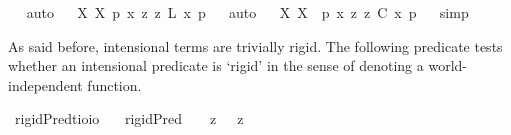 \begin{isabellebody}
\ %
%
\isamarkupfalse%
\ auto%
%
%
\ \isanewline
{}\isamarkupfalse%
\ {\isachardoublequoteopen}{\isasymlfloor}{\isacharparenleft}{\isacharparenleft}{\isasymlambda}X{\isachardot}\ \isactrlbold {\isasymbox}{\isacharparenleft}X\ {\isasymdownharpoonleft}{\isacharparenleft}p{\isacharcolon}{\isacharcolon}{\isasymup}{\isasymzero}{\isacharparenright}{\isacharparenright}{\isacharparenright}\ \isactrlbold {\isasymdown}{\isacharparenleft}{\isasymlambda}x{\isachardot}\ \isactrlbold {\isasymdiamond}{\isacharparenleft}{\isasymlambda}z{\isachardot}\ z\ \isactrlbold {\isasymapprox}\isactrlsup L\ x{\isacharparenright}\ {\isasymdownharpoonleft}p{\isacharparenright}{\isacharparenright}{\isasymrfloor}{\isachardoublequoteclose}%
\ %
%
\isamarkupfalse%
\ auto%
%
%
\ \isanewline
{}\isamarkupfalse%
\ {\isachardoublequoteopen}{\isasymlfloor}{\isacharparenleft}{\isacharparenleft}{\isasymlambda}X{\isachardot}\ \isactrlbold {\isasymbox}{\isacharparenleft}X\ \ {\isacharparenleft}p{\isacharcolon}{\isacharcolon}{\isasymup}{\isasymzero}{\isacharparenright}{\isacharparenright}{\isacharparenright}\ \isactrlbold {\isasymdown}{\isacharparenleft}{\isasymlambda}x{\isachardot}\ \isactrlbold {\isasymdiamond}{\isacharparenleft}{\isasymlambda}z{\isachardot}\ z\ \isactrlbold {\isasymapprox}\isactrlsup C\ x{\isacharparenright}\ p{\isacharparenright}{\isacharparenright}{\isasymrfloor}{\isachardoublequoteclose}%
\ %
%
\isamarkupfalse%
\ simp%
%
%
%
\isamarkuptrue%
%
\begin{isamarkuptext}%
As said before, intensional terms are trivially rigid. The following predicate tests whether an intensional
predicate is `rigid' in the sense of denoting a world-independent function.%
\end{isamarkuptext}\isamarkuptrue%
\isamarkupfalse%
\ rigidPred{\isacharcolon}{\isacharcolon}{\isachardoublequoteopen}{\isacharparenleft}{\isacharprime}t{\isasymRightarrow}io{\isacharparenright}{\isasymRightarrow}io{\isachardoublequoteclose}\ \isanewline
\ \ {\isachardoublequoteopen}rigidPred\ {\isasymtau}\ {\isasymequiv}\ {\isacharparenleft}{\isasymlambda}{\isasymbeta}{\isachardot}\ \isactrlbold {\isasymbox}{\isacharparenleft}{\isacharparenleft}{\isasymlambda}z{\isachardot}\ {\isasymbeta}\ \isactrlbold {\isasymapprox}\ z{\isacharparenright}\ \isactrlbold {\isasymdown}{\isasymtau}{\isacharparenright}{\isacharparenright}\ \isactrlbold {\isasymdown}{\isasymtau}{\isachardoublequoteclose}%

\end{isabellebody}
